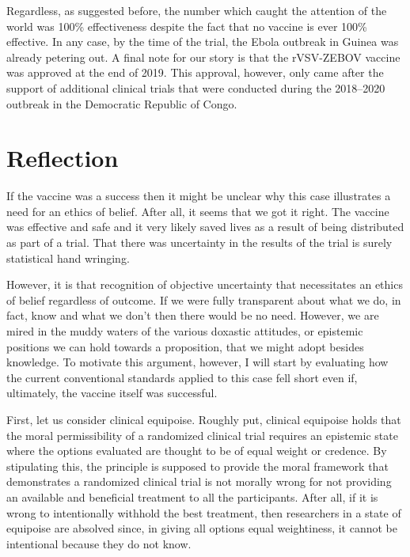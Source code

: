 \documentclass[letterpaper,notitlepage,12pt]{article}
\begin{document}
Regardless, as suggested before, the number which caught the attention of the
world was 100\% effectiveness despite the fact that no vaccine is ever 100\%
effective.
In any case, by the time of the trial, the Ebola outbreak in Guinea was already
petering out.
A final note for our story is that the rVSV-ZEBOV vaccine was
approved at the end of 2019.
This approval, however, only came after the support of additional clinical
trials that were conducted during the 2018--2020 outbreak in the Democratic
Republic of Congo.

\section{Reflection}

If the vaccine was a success then it might be
unclear why this case illustrates a need for an ethics of belief.
After all, it seems that we got it right.
The vaccine was effective and safe and it very likely
saved lives as a result of being distributed as part of a trial.
That there was uncertainty in the results of the trial is surely statistical
hand wringing.

However, it is that recognition of objective uncertainty that
necessitates an ethics of belief regardless of outcome.
If we were fully transparent about what we do, in fact, know and what we don't
then there would be no need.
However, we are mired in the muddy waters of the various doxastic attitudes, or
epistemic positions we can hold towards a proposition, that we might adopt
besides knowledge.
To motivate this argument, however, I will start by evaluating how the current
conventional standards applied to this case fell short even if, ultimately, the
vaccine itself was successful.

First, let us consider clinical equipoise.
Roughly put, clinical equipoise holds that the moral permissibility of a
randomized clinical trial requires an epistemic state
where the options evaluated are thought
to be of equal weight or credence.
By stipulating this, the principle is supposed to provide the moral framework 
that demonstrates a randomized clinical trial is not morally wrong for not 
providing an available and beneficial treatment to all the participants.
After all, if it is wrong to intentionally withhold the best treatment, then
researchers in a state of equipoise are absolved since, in giving all options
equal weightiness, it cannot be intentional because they do not know.
\end{document}
